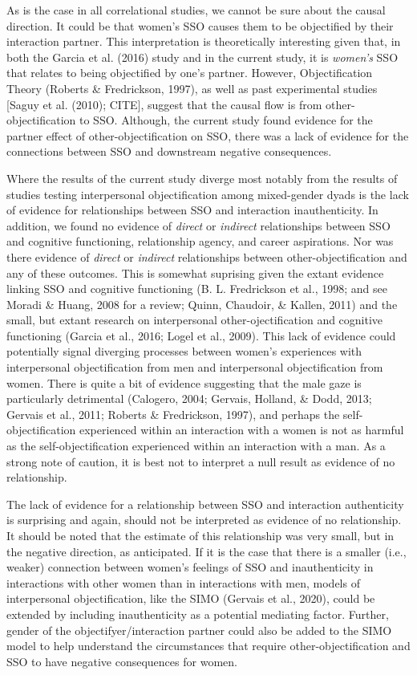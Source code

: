 \documentclass[man]{apa6}
\begin{document}
As is the case in all correlational studies, we cannot be sure about the
causal direction. It could be that women's SSO causes them to be
objectified by their interaction partner. This interpretation is
theoretically interesting given that, in both the Garcia et al. (2016)
study and in the current study, it is \emph{women's} SSO that relates to
being objectified by one's partner. However, Objectification Theory
(Roberts \& Fredrickson, 1997), as well as past experimental studies
{[}Saguy et al. (2010); CITE{]}, suggest that the causal flow is from
other-objectification to SSO. Although, the current study found evidence
for the partner effect of other-objectification on SSO, there was a lack
of evidence for the connections between SSO and downstream negative
consequences.

Where the results of the current study diverge most notably from the
results of studies testing interpersonal objectification among
mixed-gender dyads is the lack of evidence for relationships between SSO
and interaction inauthenticity. In addition, we found no evidence of
\emph{direct} or \emph{indirect} relationships between SSO and cognitive
functioning, relationship agency, and career aspirations. Nor was there
evidence of \emph{direct} or \emph{indirect} relationships between
other-objectification and any of these outcomes. This is somewhat
suprising given the extant evidence linking SSO and cognitive
functioning (B. L. Fredrickson et al., 1998; and see Moradi \& Huang,
2008 for a review; Quinn, Chaudoir, \& Kallen, 2011) and the small, but
extant research on interpersonal other-ojectification and cognitive
functioning (Garcia et al., 2016; Logel et al., 2009). This lack of
evidence could potentially signal diverging processes between women's
experiences with interpersonal objectification from men and
interpersonal objectification from women. There is quite a bit of
evidence suggesting that the male gaze is particularly detrimental
(Calogero, 2004; Gervais, Holland, \& Dodd, 2013; Gervais et al., 2011;
Roberts \& Fredrickson, 1997), and perhaps the self-objectification
experienced within an interaction with a women is not as harmful as the
self-objectification experienced within an interaction with a man. As a
strong note of caution, it is best not to interpret a null result as
evidence of no relationship.

The lack of evidence for a relationship between SSO and interaction
authenticity is surprising and again, should not be interpreted as
evidence of no relationship. It should be noted that the estimate of
this relationship was very small, but in the negative direction, as
anticipated. If it is the case that there is a smaller (i.e., weaker)
connection between women's feelings of SSO and inauthenticity in
interactions with other women than in interactions with men, models of
interpersonal objectification, like the SIMO (Gervais et al., 2020),
could be extended by including inauthenticity as a potential mediating
factor. Further, gender of the objectifyer/interaction partner could
also be added to the SIMO model to help understand the circumstances
that require other-objectification and SSO to have negative consequences
for women.
\end{document}
